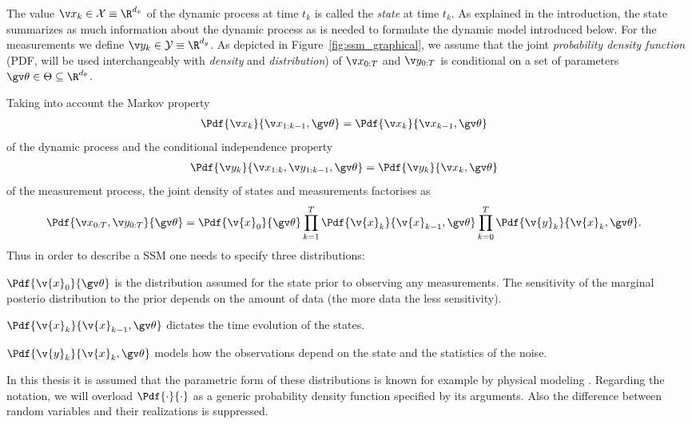 The value $\xk \in \mathcal{X} \equiv \R^{d_x}$ of the dynamic process at time $t_k$ is called the
\emph{state} at time $t_k$. As explained in the introduction, the state summarizes as much information
about the dynamic process as is needed to formulate the dynamic model introduced below. 
For the measurements we define $\yk \in \mathcal{Y} \equiv \R^{d_y}$.
As depicted in Figure~\ref{fig:ssm_graphical}, we assume that the joint \emph{probability density function} 
(PDF, will be used interchangeably with \emph{density} and \emph{distribution}) of
$\X$ and $\Y$ is conditional on a set of parameters $\Th \in \Theta \subseteq \R^{d_\theta}$. 
 
Taking into account the Markov property
\begin{align}
	\Pdf{\xk}{\x_{1:k-1},\Th}&=\Pdf{\xk}{\x_{k-1},\Th}
\end{align}
of the dynamic process and the conditional
independence property 
\begin{align}
	\Pdf{\yk}{\x_{1:k},\y_{1:k-1},\Th}&=\Pdf{\yk}{\xk,\Th}
\end{align}
of the measurement process, the joint density of states
and measurements factorises as
\begin{align}
	\Pdf{\X,\Y}{\Th}&=\Pdf{\v{x}_0}{\Th}
	\prod_{k=1}^T\Pdf{\v{x}_k}{\v{x}_{k-1},\Th}
	\prod_{k=0}^T\Pdf{\v{y}_k}{\v{x}_{k},\Th}
	\label{eq:complete_data_likelihood}.
\end{align}
Thus in order to describe a SSM one needs to specify three distributions:
\begin{description}
\addtolength{\leftskip}{1cm}
	\item[Prior distribution]
	$\Pdf{\v{x}_0}{\Th}$ is the distribution assumed for the state prior to observing any measurements. The
	sensitivity of the marginal posterio distribution to the prior depends 
	on the amount of data (the more data the less sensitivity).
	\item[Dynamic model]
	$\Pdf{\v{x}_k}{\v{x}_{k-1},\Th}$ dictates the time evolution of the states.
	\item[Measurement model]
	$\Pdf{\v{y}_k}{\v{x}_{k},\Th}$ models how the observations depend on the state and the statistics of the noise.
\end{description}
In this thesis it is assumed that the parametric form of these distributions is known
for example by physical modeling \parencite{ljung1994modeling}. Regarding the notation,
we will overload $\Pdf{\cdot}{\cdot}$ as a generic probability density function
specified by its arguments. Also the difference between random variables and their realizations is suppressed.

